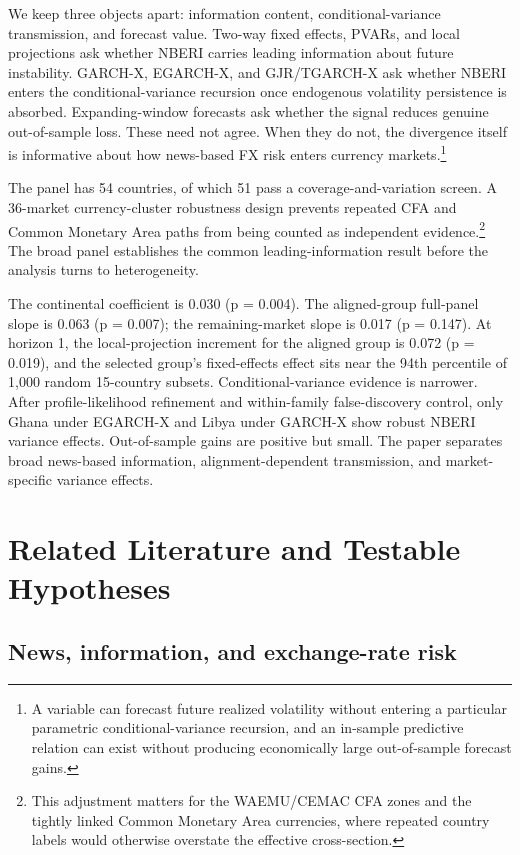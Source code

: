 \documentclass[11pt]{article}
\begin{document}
We keep three objects apart: information content, conditional-variance
transmission, and forecast value. Two-way fixed effects, PVARs, and local
projections ask whether NBERI carries leading information about future
instability. GARCH-X, EGARCH-X, and GJR/TGARCH-X ask whether NBERI enters
the conditional-variance recursion once endogenous volatility persistence
is absorbed. Expanding-window forecasts ask whether the signal reduces
genuine out-of-sample loss. These need not agree. When they do not, the
divergence itself is informative about how news-based FX risk enters
currency markets.\footnote{A variable can forecast future realized volatility without entering a particular parametric conditional-variance recursion, and an in-sample predictive relation can exist without producing economically large out-of-sample forecast gains.}

The panel has 54 countries, of which 51 pass a coverage-and-variation
screen. A 36-market currency-cluster robustness design prevents repeated
CFA and Common Monetary Area paths from being counted as independent
evidence.\footnote{This adjustment matters for the WAEMU/CEMAC CFA zones and the tightly linked Common Monetary Area currencies, where repeated country labels would otherwise overstate the effective cross-section.} The broad panel establishes the common
leading-information result before the analysis turns to heterogeneity.

The continental coefficient is 0.030 (p = 0.004). The aligned-group
full-panel slope is 0.063 (p = 0.007); the remaining-market slope is
0.017 (p = 0.147). At horizon 1, the local-projection increment for the
aligned group is 0.072 (p = 0.019), and the selected group's fixed-effects
effect sits near the 94th percentile of 1,000 random 15-country subsets.
Conditional-variance evidence is narrower. After profile-likelihood
refinement and within-family false-discovery control, only Ghana under
EGARCH-X and Libya under GARCH-X show robust NBERI variance effects.
Out-of-sample gains are positive but small. The paper separates broad
news-based information, alignment-dependent transmission, and
market-specific variance effects.

\section{Related Literature and Testable Hypotheses}\label{related-literature-and-testable-hypotheses}

\subsection{News, information, and exchange-rate
risk}\label{news-information-and-exchange-rate-risk}
\end{document}
